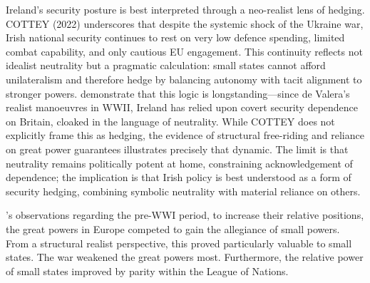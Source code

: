 \nocite{COTTEY_2022}Ireland’s security posture is best interpreted through a neo-realist lens of hedging. COTTEY (2022) underscores that despite the systemic shock of the Ukraine war, Irish national security continues to rest on very low defence spending, limited combat capability, and only cautious EU engagement. This continuity reflects not idealist neutrality but a pragmatic calculation: small states cannot afford unilateralism and therefore hedge by balancing autonomy with tacit alignment to stronger powers. \parencite{FANNING_2015,AYIOTIS_2023} demonstrate that this logic is longstanding—since de Valera’s realist manoeuvres in WWII, Ireland has relied upon covert security dependence on Britain, cloaked in the language of neutrality. While COTTEY does not explicitly frame this as hedging, the evidence of structural free-riding and reliance on great power guarantees illustrates precisely that dynamic. The limit is that neutrality remains politically potent at home, constraining acknowledgement of dependence; the implication is that Irish policy is best understood as a form of security hedging, combining symbolic neutrality with material reliance on others.

\parencite{HANDEL_2005}'s observations regarding the pre-WWI period, to increase their relative positions, the great powers in Europe competed to gain the allegiance of small powers. From a structural realist perspective, this proved particularly valuable to small states. The war weakened the great powers most. Furthermore, the relative power of small states improved by parity within the League of Nations.

